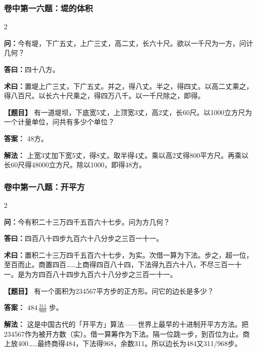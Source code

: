 \documentclass[11pt,a4paper]{article}
\begin{document}
\vspace{0.3cm}

\subsubsection*{卷中第一六题：堤的体积}
\begin{paracol}{2}
\begin{problemclassical}
\textbf{问：}今有堤，下广五丈，上广三丈，高二丈，长六十尺。欲以一千尺为一方，问计几何？

\textbf{答曰：}四十八方。

\textbf{术曰：}置堤上广三丈，下广五丈。并之，得八丈。半之，得四丈。以高二丈乘之，得八百尺。以长六十尺乘之，得四万八千。以一千尺除之，即得。
\end{problemclassical}
\switchcolumn
\begin{problemmodern}
\textbf{【题目】} 有一道堤坝，下底宽5丈，上顶宽3丈，高2丈，长60尺。以1000立方尺为一个计量单位，问共有多少个单位？

\textbf{答案：} 48方。

\textbf{解法：} 上宽3丈加下宽5丈，得8丈。取半得4丈。乘以高2丈得800平方尺。再乘以长60尺得48000立方尺。除以1000，即得48方。
\end{problemmodern}
\end{paracol}

\vspace{0.3cm}

\subsubsection*{卷中第一八题：开平方}
\begin{paracol}{2}
\begin{problemclassical}
\textbf{问：}今有积二十三万四千五百六十七步。问为方几何？

\textbf{答曰：}四百八十四步九百六十八分步之三百一十一。

\textbf{术曰：}置积二十三万四千五百六十七步，为实。次借一算为下法。步之，超一位，至百而止。商置四百……上商得四百八十四，下法得九百六十八，不尽三百一十一。是为方四百八十四步九百六十八分步之三百一十一。
\end{problemclassical}
\switchcolumn
\begin{problemmodern}
\textbf{【题目】} 有一个面积为234567平方步的正方形。问它的边长是多少？

\textbf{答案：} $484\,\frac{311}{968}$ 步。

\textbf{解法：} 这是中国古代的「开平方」算法——世界上最早的十进制开平方方法。把234567作为被开方数（实）。借一算筹作为下法。隔一位跳一步，到百位为止。商上放400……最终商得484，下法得968，余数311。所以边长为484又311/968步。
\end{problemmodern}
\end{paracol}
\end{document}
